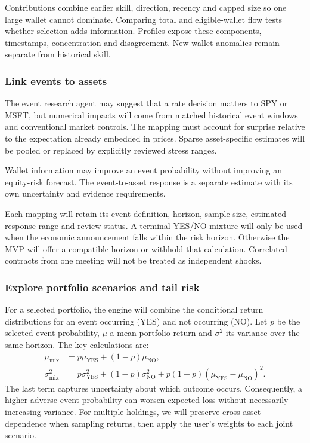 Contributions combine earlier skill, direction, recency and capped size so one large wallet cannot dominate. Comparing total and eligible-wallet flow tests whether selection adds information. Profiles expose these components, timestamps, concentration and disagreement. New-wallet anomalies remain separate from historical skill.

\subsubsection{Link events to assets}
The event research agent may suggest that a rate decision matters to SPY or MSFT, but numerical impacts will come from matched historical event windows and conventional market controls. The mapping must account for surprise relative to the expectation already embedded in prices. Sparse asset-specific estimates will be pooled or replaced by explicitly reviewed stress ranges.

Wallet information may improve an event probability without improving an equity-risk forecast. The event-to-asset response is a separate estimate with its own uncertainty and evidence requirements.

Each mapping will retain its event definition, horizon, sample size, estimated response range and review status. A terminal YES/NO mixture will only be used when the economic announcement falls within the risk horizon. Otherwise the MVP will offer a compatible horizon or withhold that calculation. Correlated contracts from one meeting will not be treated as independent shocks.

\clearpage
\subsubsection{Explore portfolio scenarios and tail risk}
For a selected portfolio, the engine will combine the conditional return distributions for an event occurring (YES) and not occurring (NO). Let $p$ be the selected event probability, $\mu$ a mean portfolio return and $\sigma^2$ its variance over the same horizon. The key calculations are:
\begin{align}
\mu_{\mathrm{mix}} &= p\mu_{\mathrm{YES}}+(1-p)\mu_{\mathrm{NO}}, \\
\sigma^2_{\mathrm{mix}} &= p\sigma^2_{\mathrm{YES}}+(1-p)\sigma^2_{\mathrm{NO}}
 +p(1-p)(\mu_{\mathrm{YES}}-\mu_{\mathrm{NO}})^2.
\end{align}
The last term captures uncertainty about which outcome occurs. Consequently, a higher adverse-event probability can worsen expected loss without necessarily increasing variance. For multiple holdings, we will preserve cross-asset dependence when sampling returns, then apply the user's weights to each joint scenario.

